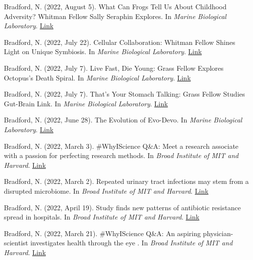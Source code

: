 \documentclass[margin, 10pt]{res} %
\begin{document}
\begin{resume}
Bradford, N. (2022, August 5). What Can Frogs Tell Us About Childhood Adversity? Whitman Fellow Sally Seraphin Explores. In {\sl Marine Biological Laboratory}. \href{https://www.mbl.edu/news/what-can-frogs-tell-us-about-childhood-adversity-whitman-fellow-sally-seraphin-explores}{Link}

Bradford, N. (2022, July 22). Cellular Collaboration: Whitman Fellow Shines Light on Unique Symbiosis. In {\sl Marine Biological Laboratory}. \href{https://www.mbl.edu/news/cellular-collaboration-whitman-fellow-shines-light-unique-symbiosis}{Link}

Bradford, N. (2022, July 7). Live Fast, Die Young: Grass Fellow Explores Octopus's Death Spiral. In {\sl Marine Biological Laboratory}. \href{https://www.mbl.edu/news/live-fast-die-young-grass-fellow-explores-octopuss-death-spiral}{Link}

Bradford, N. (2022, July 7). That’s Your Stomach Talking: Grass Fellow Studies Gut-Brain Link. In {\sl Marine Biological Laboratory}. \href{https://www.mbl.edu/news/thats-your-stomach-talking-grass-fellow-studies-gut-brain-link}{Link}

Bradford, N. (2022, June 28). The Evolution of Evo-Devo. In {\sl Marine Biological Laboratory}. \href{https://www.mbl.edu/news/evolution-evo-devo}{Link}

Bradford, N. (2022, March 3). \#WhyIScience Q\&A: Meet a research associate with a passion for perfecting research methods. In {\sl Broad Institute of MIT and Harvard}. \href{https://www.broadinstitute.org/blog/whyiscience-qa-meet-research-associate-passion-perfecting-research-methods}{Link}

Bradford, N. (2022, March 2). Repeated urinary tract infections may stem from a disrupted microbiome. In {\sl Broad Institute of MIT and Harvard}. \href{https://www.broadinstitute.org/news/repeated-urinary-tract-infections-may-stem-disrupted-microbiome}{Link}


Bradford, N. (2022, April 19). Study finds new patterns of antibiotic resistance spread in hospitals. In {\sl Broad Institute of MIT and Harvard}. \href{https://www.broadinstitute.org/news/study-finds-new-patterns-antibiotic-resistance-spread-hospitals}{Link}

Bradford, N. (2022, March 21). \#WhyIScience Q\&A: An aspiring physician-scientist investigates health through the eye
. In {\sl Broad Institute of MIT and Harvard}. \href{https://www.broadinstitute.org/blog/whyiscience-qa-aspiring-physician-scientist-investigates-health-through-eye}{Link}


\end{resume}
\end{document}
